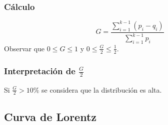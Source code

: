\subsubsection{Cálculo}
$$G=\dfrac{\displaystyle\sum_{i=1}^{k-1}(p_i-q_i)}{\displaystyle\sum_{i=1}^{k-1}p_i}$$
Observar que $0\leq G \leq 1$ y $0\leq\frac{G}{2}\leq \frac{1}{2}$.
\subsubsection{Interpretación de $\frac{G}{2}$}
Si $\frac{G}{2}>10\%$ se considera que la distribución es alta.
\subsection{Curva de Lorentz}

